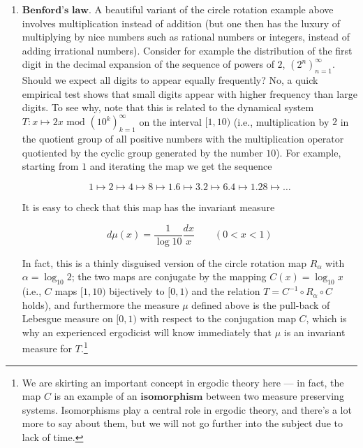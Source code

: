 \documentclass[11pt]{report}
\theoremstyle{plain}
\theoremstyle{definition}
\begin{document}
\begin{enumerate}[label=\arabic*.]
$\textbf{Note.}$ Theorem \ref{thm-equidistribution} was proved in 1909 and 1910 independently by Weyl, Sierpinski and Bohl. In 1916 Weyl showed that the sequence $\{ n^2 \alpha \}$ is equidistributed, and more generally that $\{ p(n) \}$ is equidistributed if $p(x)$ is a polynomial with at least one irrational coefficient. Vinogradov proved in 1935 that if $\alpha$ is irrational then the sequence $\{ p_n \alpha \}$ is equidistributed, where $p_n$ is the $n$th prime number. Jean Bourgain (winner of a 1994 Fields Medal) proved similar statements in the more general setting of the pointwise ergodic theorem (i.e., the ergodic averages of the form $\frac{1}{n}\sum_{k=1}^n X\circ T^{k^2}$ and $\frac{1}{n}\sum_{k=1}^n X\circ T^{p_k}$ in a measure preserving system converge almost surely, under mild integrability conditions).
\item $\textbf{Benford's law.}$ A beautiful variant of the circle rotation example above involves multiplication instead of addition (but one then has the luxury of multiplying by nice numbers such as rational numbers or integers, instead of adding irrational numbers). Consider for example the distribution of the first digit in the decimal expansion of the sequence of powers of $2$, $(2^n)_{n=1}^\infty$. Should we expect all digits to appear equally frequently? No, a quick empirical test shows that small digits appear with higher frequency than large digits. To see why, note that this is related to the dynamical system $T:x\mapsto 2x \textrm{ mod } (10^k)_{k=1}^\infty$ on the interval $[1,10)$ (i.e., multiplication by $2$ in the quotient group of all positive numbers with the multiplication operator quotiented by the cyclic group generated by the number $10$). For example, starting from $1$ and iterating the map we get the sequence

\[
1 \mapsto 2 \mapsto 4 \mapsto 8 \mapsto 1.6 \mapsto 3.2 \mapsto 6.4 \mapsto 1.28 \mapsto \ldots
\]

It is easy to check that this map has the invariant measure

\[
d\mu(x) = \frac{1}{\log 10} \frac{dx}{x} \qquad (0<x<1)
\]

In fact, this is a thinly disguised version of the circle rotation map $R_\alpha$ with $\alpha=\log_{10} 2$; the two maps are conjugate by the mapping $C(x) = \log_{10} x$ (i.e., $C$ maps $[1,10)$ bijectively to $[0,1)$ and the relation $T = C^{-1} \circ R_\alpha\circ C$ holds), and furthermore the measure $\mu$ defined above is the pull-back of Lebesgue measure on $[0,1)$ with respect to the conjugation map $C$, which is why an experienced ergodicist will know immediately that $\mu$ is an invariant measure for $T$.\footnote{We are skirting an important concept in ergodic theory here --- in fact, the map $C$ is an example of an $\textbf{isomorphism}$ between two measure preserving systems. Isomorphisms play a central role in ergodic theory, and there's a lot more to say about them, but we will not go further into the subject due to lack of time.}


\end{enumerate}
\end{document}
